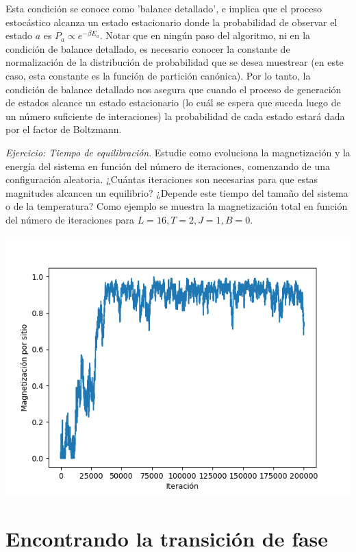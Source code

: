 \documentclass[a4paper,11pt,oneside]{article}
\begin{document}
Esta condición se conoce como 'balance detallado', e implica que el proceso
estocástico alcanza un estado estacionario donde la probabilidad de observar el
estado $a$ es $P_a \propto e^{-\beta E_a}$. Notar que en ningún paso del
algoritmo, ni en la condición de balance detallado, es necesario conocer la
constante de normalización de la distribución de probabilidad que se desea
muestrear (en este caso, esta constante es la función de partición canónica).
Por lo tanto, la condición de balance detallado nos asegura que cuando el
proceso de generación de estados alcance un estado estacionario (lo cuál se
espera que suceda luego de un número suficiente de interaciones) la
probabilidad de cada estado estará dada por el factor de Boltzmann. 


\begin{mdframed}
\emph{Ejercicio: Tiempo de equilibración}. Estudie como evoluciona la
magnetización y la energía del sistema en función del número de iteraciones,
comenzando de una configuración aleatoria. ¿Cuántas iteraciones son necesarias
para que estas magnitudes alcancen un equilibrio? ¿Depende este tiempo del
tamaño del sistema o de la temperatura? Como ejemplo se muestra la
magnetización total en función del número de iteraciones para $L=16,T=2,J=1,B=0$.

{\centering \includegraphics[scale=.6]{./figuras/equil_mag.png}\par}

\end{mdframed}

\section{Encontrando la transición de fase}
\end{document}
